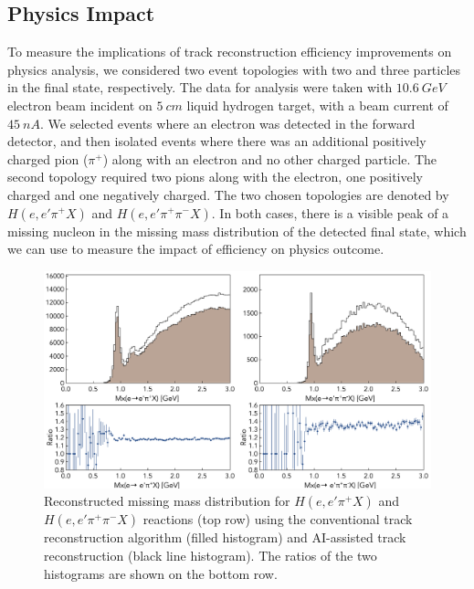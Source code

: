 \subsection{Physics Impact}

To measure the implications of track reconstruction efficiency improvements on physics analysis, 
we considered two event topologies with two and three particles in the final state, respectively. 
The data for analysis were taken with $10.6~GeV$ electron beam incident on $5~cm$ liquid 
hydrogen target, with a beam current of $45~nA$. 
We selected events where an electron was detected in the forward detector, and then isolated 
events where there was an additional positively charged pion ($\pi^+$) along with an electron 
and no other charged particle. The second topology required two pions along with the electron, 
one positively charged and one negatively charged. The two chosen topologies are denoted by 
$H(e,e'\pi^+X)$ and $H(e,e'\pi^+\pi^-X)$. In both cases, there is a visible peak of a missing nucleon
in the missing mass distribution of the detected final state, which we can use to measure the impact 
of efficiency on physics outcome. 

 \begin{figure}[!ht]
\begin{center}
 \includegraphics[width=6.0in]{images/physics_scan.pdf}
\caption {Reconstructed missing mass distribution for $H(e,e'\pi^+X)$ and $H(e,e'\pi^+\pi^-X)$ 
reactions (top row) using the conventional track reconstruction algorithm (filled histogram) and  
AI-assisted track reconstruction (black line histogram). The ratios of the two histograms are shown 
on the bottom row. }
 \label{physics:outcome}
 \end{center}
\end{figure}

